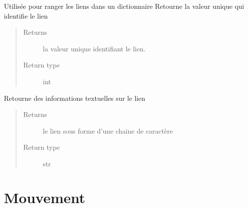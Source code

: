\documentclass[letterpaper,10pt,english]{sphinxmanual}
\begin{document}
\begin{fulllineitems}
\begin{fulllineitems}
\end{fulllineitems}


\begin{fulllineitems}
\label{index:Lien.Lien.hash}
Utilisée pour ranger les liens dans un dictionnaire
Retourne la valeur unique qui identifie le lien
\begin{quote}\begin{description}
\item[{Returns}] \leavevmode
la valeur unique identifiant le lien.

\item[{Return type}] \leavevmode
int

\end{description}\end{quote}

\end{fulllineitems}


\begin{fulllineitems}
\label{index:Lien.Lien.toString}
Retourne des informations textuelles sur le lien
\begin{quote}\begin{description}
\item[{Returns}] \leavevmode
le lien sous forme d'une chaine de caractère

\item[{Return type}] \leavevmode
str

\end{description}\end{quote}

\end{fulllineitems}


\end{fulllineitems}



\chapter{Mouvement}
\label{index:mouvement}\label{index:module-Mouvement}
\end{document}
